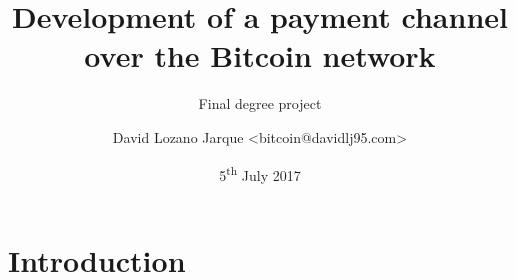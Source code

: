 \documentclass{beamer}
\begin{document}
\title{Development of a payment channel over the Bitcoin network}
\subtitle{Final degree project}
\author{David Lozano Jarque <bitcoin@davidlj95.com>}
\date{5\textsuperscript{th} July 2017}
\subject{Computer Science}
\frame{\titlepage}
\section{Introduction}
\end{document}
